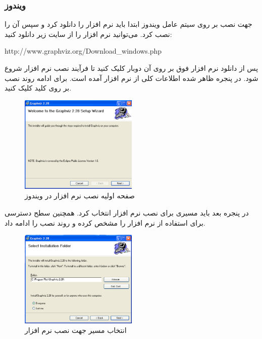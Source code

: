 \subsubsection{ویندوز}

\begin{webreference}
جهت نصب  بر روی سیتم عامل ویندوز ابتدا باید نرم افزار را دانلود کرد
و سپس آن را نصب کرد. می‌توانید نرم افزار را از سایت زیر دانلود کنید:
\begin{latin}
http://www.graphviz.org/Download\_windows.php
\end{latin}
\end{webreference}

پس از دانلود نرم افزار فوق بر روی آن دوبار کلیک کنید تا فرآیند نصب نرم افزار
شروع شود. در پنجره ظاهر شده اطلاعات کلی از نرم افزار آمده است. برای ادامه روند
نصب بر روی کلید  کلیک کنید.

\begin{figure}
	\centering
	\includegraphics[width=0.5\textwidth]{image/write/graph/graphviz/install-1}
	\caption[صفحه اولیه نصب نرم افزار در ویندوز]{
		صفحه اولیه نصب نرم افزار در ویندوز
	}
	\label{image/write/graph/graphviz/install-1}
\end{figure}

در پنجره بعد باید مسیری برای نصب نرم افزار انتخاب کرد. همچنین سطح دسترسی برای
استفاده از نرم افزار را مشخص کرده و روند نصب را ادامه داد.

\begin{figure}
	\centering
	\includegraphics[width=0.5\textwidth]{image/write/graph/graphviz/install-2}
	\caption[انتخاب مسیر جهت نصب نرم افزار]{
		انتخاب مسیر جهت نصب نرم افزار	
	}
	\label{image/write/graph/graphviz/install-2}
\end{figure}


